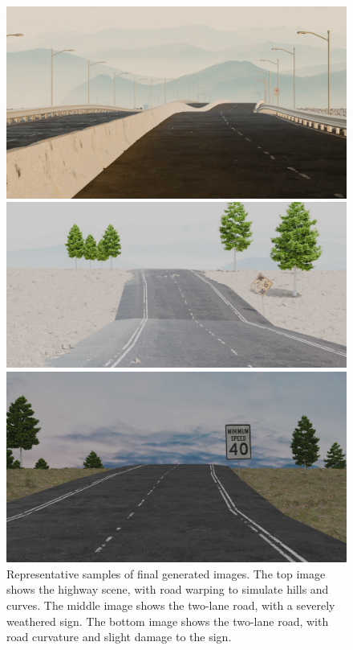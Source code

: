 \documentclass[journal]{IEEEtran}
\begin{document}
\begin{figure}[ht]
    \centering
    \begin{minipage}{0.5\textwidth}
        \centering
        \includegraphics[width=\linewidth]{images/road1.png}

    \end{minipage}\hfill
    \begin{minipage}{0.5\textwidth}
        \centering
        \includegraphics[width=\linewidth]{images/road2.png}

    \end{minipage}\hfill
    \begin{minipage}{0.5\textwidth}
        \centering
        \includegraphics[width=\linewidth]{images/road3.png}

    \end{minipage}
    \caption{Representative samples of final generated images. The top image shows the highway scene, with road warping to simulate hills and curves. The middle image shows the two-lane road, with a severely weathered sign. The bottom image shows the two-lane road, with road curvature and slight damage to the sign.  }
    \label{fig:row_of_images}
\end{figure}
\end{document}

